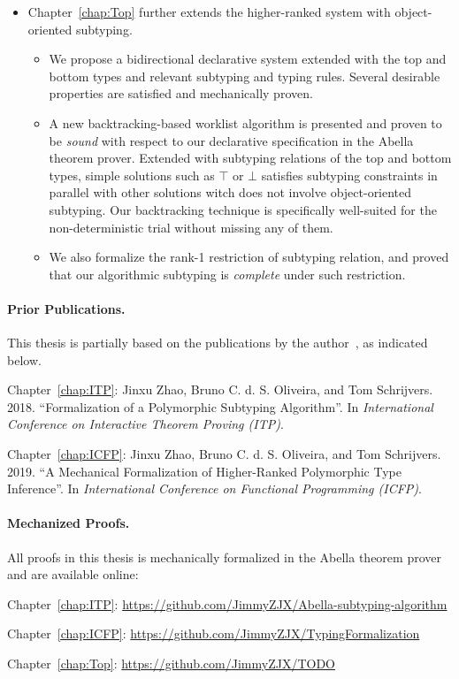 \begin{itemize}
  \item Chapter~\ref{chap:Top}
    further extends the higher-ranked system with object-oriented subtyping.
    \begin{itemize}
      \item We propose a bidirectional declarative system extended with
        the top and bottom types and relevant subtyping and typing rules.
        Several desirable properties are satisfied and mechanically proven.
      \item A new backtracking-based worklist algorithm is presented and
        proven to be \emph{sound} with respect to our declarative specification
        in the Abella theorem prover.
        Extended with subtyping relations of the top and bottom types,
        simple solutions such as $\top$ or $\bot$ satisfies subtyping constraints
        in parallel with other solutions witch does not involve object-oriented subtyping.
        Our backtracking technique is specifically well-suited for the
        non-deterministic trial without missing any of them.
      \item We also formalize the rank-1 restriction of subtyping relation,
        and proved that our algorithmic subtyping is \emph{complete} under such restriction.
    \end{itemize}
\end{itemize}



\paragraph{Prior Publications.}
This thesis is partially based on the publications by the author~\citep{itp2018,icfp2019},
as indicated below.
\begin{description}
\item Chapter~\ref{chap:ITP}: Jinxu Zhao, Bruno C. d. S. Oliveira, and Tom Schrijvers. 2018.
  ``Formalization of a Polymorphic Subtyping Algorithm''.
  In \emph{International Conference on Interactive Theorem Proving (ITP)}.
\item Chapter~\ref{chap:ICFP}: Jinxu Zhao, Bruno C. d. S. Oliveira, and Tom Schrijvers. 2019.
  ``A Mechanical Formalization of Higher-Ranked Polymorphic Type Inference''.
  In \emph{International Conference on Functional Programming (ICFP)}.
\end{description}

\paragraph{Mechanized Proofs.}
All proofs in this thesis is mechanically formalized in the Abella theorem prover
and are available online:
\begin{description}
  \item Chapter~\ref{chap:ITP}: \url{https://github.com/JimmyZJX/Abella-subtyping-algorithm}
  \item Chapter~\ref{chap:ICFP}: \url{https://github.com/JimmyZJX/TypingFormalization}
  \item Chapter~\ref{chap:Top}: \url{https://github.com/JimmyZJX/TODO}
\end{description}

\noindent\makebox[\linewidth]{\rule{0.7\textwidth}{0.4pt}}

\vspace{1.5\baselineskip}




